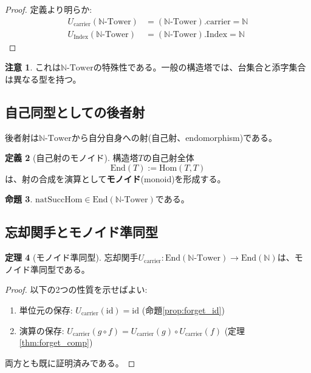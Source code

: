 \documentclass[a4paper,12pt]{article}
\theoremstyle{definition}
\newtheorem{definition}{定義}[section]
\newtheorem{theorem}[definition]{定理}
\newtheorem{proposition}[definition]{命題}
\newtheorem{remark}[definition]{注意}
\begin{document}
\begin{proof}
定義より明らか:
\begin{align*}
U_{\text{carrier}}(\mathbb{N}\text{-Tower}) &= (\mathbb{N}\text{-Tower}).\text{carrier} = \mathbb{N} \\
U_{\text{Index}}(\mathbb{N}\text{-Tower}) &= (\mathbb{N}\text{-Tower}).\text{Index} = \mathbb{N}
\end{align*}
\end{proof}

\begin{remark}
これは$\mathbb{N}\text{-Tower}$の特殊性である。一般の構造塔では、台集合と添字集合は異なる型を持つ。
\end{remark}

\subsection{自己同型としての後者射}

後者射は$\mathbb{N}\text{-Tower}$から自分自身への射(自己射、endomorphism)である。

\begin{definition}[自己射のモノイド]
構造塔$T$の自己射全体
\[
\text{End}(T) := \text{Hom}(T, T)
\]
は、射の合成を演算として\textbf{モノイド}(monoid)を形成する。
\end{definition}

\begin{proposition}
$\text{natSuccHom} \in \text{End}(\mathbb{N}\text{-Tower})$である。
\end{proposition}

\subsection{忘却関手とモノイド準同型}

\begin{theorem}[モノイド準同型]
忘却関手$U_{\text{carrier}} : \text{End}(\mathbb{N}\text{-Tower}) \to \text{End}(\mathbb{N})$は、モノイド準同型である。
\end{theorem}

\begin{proof}
以下の2つの性質を示せばよい:
\begin{enumerate}
\item 単位元の保存: $U_{\text{carrier}}(\text{id}) = \text{id}$ (命題\ref{prop:forget_id})
\item 演算の保存: $U_{\text{carrier}}(g \circ f) = U_{\text{carrier}}(g) \circ U_{\text{carrier}}(f)$ (定理\ref{thm:forget_comp})
\end{enumerate}
両方とも既に証明済みである。
\end{proof}
\end{document}
